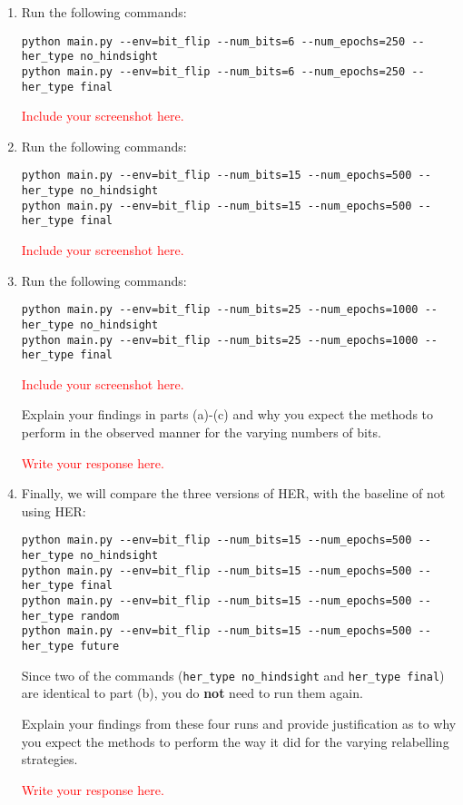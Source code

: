 \documentclass[12pt]{article}
\begin{document}
\begin{enumerate}[label=\alph*)]

\item Run the following commands:

\small
\verb|python main.py --env=bit_flip --num_bits=6 --num_epochs=250 --her_type no_hindsight| \\
\verb|python main.py --env=bit_flip --num_bits=6 --num_epochs=250 --her_type final|

\textcolor{red}{Include your screenshot here.}

\normalsize
\item Run the following commands:

\small
\verb|python main.py --env=bit_flip --num_bits=15 --num_epochs=500 --her_type no_hindsight| \\
\verb|python main.py --env=bit_flip --num_bits=15 --num_epochs=500 --her_type final|

\textcolor{red}{Include your screenshot here.}


\normalsize
\item Run the following commands:

\small
\verb|python main.py --env=bit_flip --num_bits=25 --num_epochs=1000 --her_type no_hindsight| \\
\verb|python main.py --env=bit_flip --num_bits=25 --num_epochs=1000 --her_type final|

\textcolor{red}{Include your screenshot here.}

\normalsize Explain your findings in parts (a)-(c) and why you expect the methods to perform in the observed manner for the varying numbers of bits.

\textcolor{red}{Write your response here.}

\normalsize
\item Finally, we will compare the three versions of HER, with the baseline of not using HER:

\small
\verb|python main.py --env=bit_flip --num_bits=15 --num_epochs=500 --her_type no_hindsight| \\
\verb|python main.py --env=bit_flip --num_bits=15 --num_epochs=500 --her_type final| \\
\verb|python main.py --env=bit_flip --num_bits=15 --num_epochs=500 --her_type random| \\
\verb|python main.py --env=bit_flip --num_bits=15 --num_epochs=500 --her_type future|

\normalsize
Since two of the commands (\verb|her_type no_hindsight| and \verb|her_type final|) are identical to part (b), you do \textbf{not} need to run them again.

\normalsize Explain your findings from these four runs and provide justification as to why you expect the methods to perform the way it did for the varying relabelling strategies.

\textcolor{red}{Write your response here.}

\end{enumerate}
\end{document}
